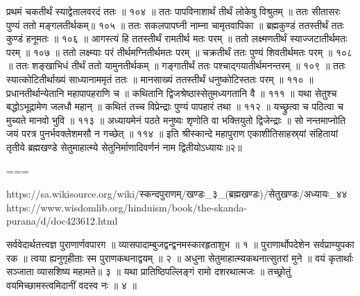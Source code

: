 प्रथमं चकतीर्थं स्याद्वेतालवरदं ततः ॥ १०४ ॥
ततः पापविनाशार्थं तीर्थं लोकेषु विश्रुतम् ॥
ततः सीतासरः पुण्यं ततो मङ्गलतीर्थकम्॥ १०५ ॥
ततः सकलपापघ्नी नाम्ना चामृतवापिका ॥
ब्रह्मकुण्डं ततस्तीर्थं ततः कुण्डं हनूमतः ॥ १०६ ॥
आगस्त्यं हि ततस्तीर्थं रामतीर्थ मतः परम् ॥
ततो लक्ष्मणतीर्थं स्याज्जटातीर्थमतः परम् ॥ १०७ ॥
ततो लक्ष्म्याः परं तीर्थमग्नितीर्थमतः परम् ॥
चक्रतीर्थं ततः पुण्यं शिवतीर्थमतः परम् ॥ १०८ ॥
ततः शङ्खाभिधं तीर्थं ततो यामुनतीर्थकम् ॥
गङ्गातीर्थं ततः पश्चाद्गयातीर्थमनन्तरम् ॥ १०९ ॥
ततः स्यात्कोटितीर्थाख्यं साध्यानाममृतं ततः ॥
मानसाख्यं ततस्तीर्थं धनुष्कोटिस्ततः परम् ॥ ११० ॥
प्रधानतीर्थान्येतानि महापापहराणि च ॥
कथितानि द्विजश्रेष्ठास्सेतुमध्यगतानि वै ॥ १११ ॥
यथा सेतुश्च बद्धोऽभूद्रामेण जलधौ महान् ॥
कथितं तच्च विप्रेन्द्राः पुण्यं पापहारं तथा ॥ ११२ ॥
यच्छ्रुत्वा च पठित्वा च मुच्यते मानवो भुवि ॥ ११३ ॥
अध्यायमेनं पठते मनुष्यः शृणोति वा भक्तियुतो द्विजेन्द्राः ॥
सो नन्तमाप्नोति जयं परत्र पुनर्भवक्लेशमसौ न गच्छेत् ॥ ११४ ॥
इति श्रीस्कान्दे महापुराण एकाशीतिसाहस्र्यां संहितायां तृतीये ब्रह्मखण्डे सेतुमाहात्म्ये सेतुनिर्माणादिवर्णनं नाम द्वितीयोऽध्यायः॥२॥


===

https://sa.wikisource.org/wiki/स्कन्दपुराणम्/खण्डः_३_(ब्रह्मखण्डः)/सेतुखण्डः/अध्यायः_४४
https://www.wisdomlib.org/hinduism/book/the-skanda-purana/d/doc423612.html


सर्ववेदार्थतत्त्वज्ञ पुराणार्णवपारग ॥
व्यासपादाम्बुजद्वन्द्वनमस्कारहृताशुभ ॥ १ ॥
पुराणार्थोपदेशेन सर्वप्राण्युपका रक ॥
त्वया ह्यनुगृहीताः स्म पुराणकथनाद्वयम् ॥ २ ॥
अधुना सेतुमाहात्म्यकथनात्सुतरां मुने ॥
वयं कृतार्थाः सञ्जाता व्यासशिष्य महामते॥ ३ ॥
यथा प्रातिष्ठिपल्लिङ्गं रामो दशरथात्मजः ॥
तच्छ्रोतुं वयमिच्छामस्त्वमिदानीं वदस्व नः ॥ ४ ॥

